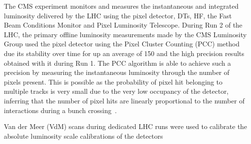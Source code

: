 The CMS experiment monitors and measures the instantaneous and integrated luminosity delivered by the LHC using the pixel detector, DTs, HF, the Fast Beam Conditions Monitor and Pixel Luminosity Telescope.
During Run 2 of the LHC, the primary offline luminosity measurements made by the CMS Luminosity Group used the pixel detector using the Pixel Cluster Counting (PCC) method due its stability over time for up an average \PU of 150 and the high precision results obtained with it during Run 1.
The PCC algorithm is able to achieve such a precision by measuring the instantaneous luminosity through the number of pixels present. 
This is possible as the probability of pixel hit belonging to multiple tracks is very small due to the very low occupancy of the detector, inferring that the number of pixel hits are linearly proportional to the number of interactions during a bunch crossing~\cite{CMS:2017_lumi}.

Van der Meer (VdM) scans during dedicated LHC runs were used to calibrate the absolute luminosity scale calibrations of the detectors~\cite{vanderMeer:1968zz}
